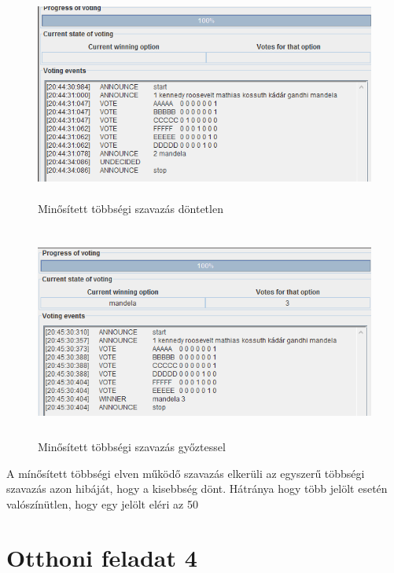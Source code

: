 \begin{figure}[!h]
\begin{center}
\includegraphics[height=7cm]{figures/ofel3_1.png}
\caption{Minősített többségi szavazás döntetlen}
\end{center}
\end{figure}
\begin{figure}[!h]
\begin{center}
\includegraphics[height=7cm]{figures/ofel3_2.png}
\caption{Minősített többségi szavazás győztessel}
\end{center}
\end{figure}
A mínősített többségi elven működő szavazás elkerüli az egyszerű többségi szavazás azon hibáját, hogy a kisebbség dönt. Hátránya hogy több jelölt esetén valószínütlen, hogy egy jelölt eléri az 50%

\section{Otthoni feladat 4}
